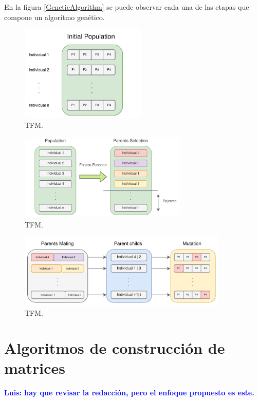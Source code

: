 \documentclass{uathesis-es}
\begin{document}
En la figura \ref{GeneticAlgorithm} se puede observar cada una de las etapas que compone un algoritmo genético.


\begin{figure}[H]
    \centering
    \includegraphics[width=6cm]{Figures/GA/inicializacion.png}
    \caption{TFM.}
    \label{GA_inicializacion}
\end{figure}
\begin{figure}[H]
    \centering
    \includegraphics[width=8cm]{Figures/GA/selection.png}
    \caption{TFM.}
    \label{GA_selection}
\end{figure}
\begin{figure}[H]
    \centering
    \includegraphics[width=10cm]{Figures/GA/cruce_mutacion.png}
    \caption{TFM.}
    \label{GA_cruce_mutacion}
\end{figure}

\section{Algoritmos de construcción de matrices}
\label{SOAT_MATRIX_ALGORITHM_CONSTRUCTION}

\textcolor{blue}{\textbf{Luis: hay que revisar la redacción, pero el enfoque propuesto es este.}}\\
\end{document}
